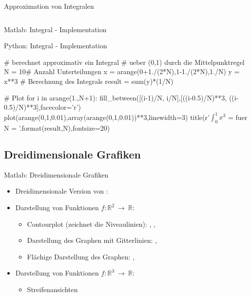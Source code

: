 \documentclass[hyperref={xetex}]{beamer}
\begin{document}
\begin{frame}[fragile]{Approximation von Integralen}
\begin{columns}[t]
\end{columns}
\end{frame}
% 
% 
\begin{frame}[fragile]{Matlab: Integral - Implementation}
\end{frame}
% 
% 
\begin{frame}[fragile]{Python: Integral - Implementation}
  \begin{pyin}
# berechnet approximativ ein Integral 
# ueber  (0,1) durch die Mittelpunktregel
N = 10# Anzahl Unterteilungen
x = arange(0+1./(2*N),1-1./(2*N),1./N)
y = x**3
# Berechnung des Integrals
result = sum(y)*(1/N)

# Plot
for i in arange(1.,N+1):
    fill_between([(i-1)/N, i/N],[((i-0.5)/N)**3,  ((i-0.5)/N)**3],facecolor='r')
plot(arange(0,1,0.01),array(arange(0,1,0.01))**3,linewidth=3)
title(r'$\int_0^1 x^3$ = {} fuer N = {}'.format(result,N),fontsize=20)    
  \end{pyin}
\end{frame}

\subsection{Dreidimensionale Grafiken}

% 
% 
% 
\begin{frame}[fragile]{Matlab: Dreidimensionale Grafiken}
\begin{itemize}
\item Dreidimensionale Version von : \alert{ }
\item Darstellung von Funktionen $f:\mathbb{R}^2 \ \rightarrow \
  \mathbb{R}$:
\begin{itemize}
\item Contourplot (zeichnet die Niveaulinien): \alert{ }, \alert{
    \imatlab{contourf}}, \alert{ \imatlab{contour3}}
\item Darstellung des Graphen mit Gitterlinien: \alert{  ,
  \imatlab{meshc}} 
\item Flächige Darstellung des Graphen: \alert{ , }
\end{itemize} 
\item Darstellung von Funktionen $f:\mathbb{R}^3 \ \rightarrow \
  \mathbb{R}$:
\begin{itemize}
\item Streifenansichten \alert{ }
\end{itemize}
\end{itemize}
\end{frame}
\end{document}
